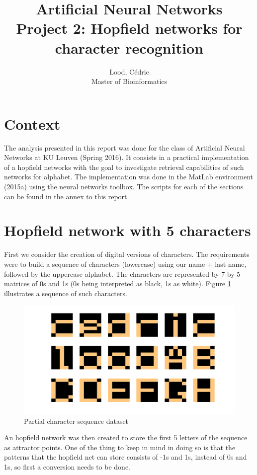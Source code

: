 \documentclass[11pt, a4paper]{article}
\title{ \huge Artificial Neural Networks \\ 
  { \large Project 2: Hopfield networks for character recognition}}
\author{
        Lood, Cédric \\
        \small Master of Bioinformatics
}
\begin{document}
\maketitle

\section{Context}
The analysis presented in this report was done for the class of
Artificial Neural Networks at KU Leuven (Spring 2016). It consists in
a practical implementation of a hopfield networks with the goal to
investigate retrieval capabilities of such networks for alphabet. The
implementation was done in the MatLab environment (2015a) using the
neural networks toolbox. The scripts for each of the sections can be
found in the annex to this report.

\section{Hopfield network with 5 characters}

First we consider the creation of digital versions of characters. The
requirements were to build a sequence of characters (lowercase) using
our name + last name, followed by the uppercase alphabet. The
characters are represented by 7-by-5 matrices of 0s and 1s (0s being
interpreted as black, 1s as white). Figure \ref{fig:hopfield_chargen}
illustrates a sequence of such characters.

\begin{figure}[H]
  \centering
  \includegraphics[scale=.30]{hopfield_chargen.png}
  \caption{Partial character sequence dataset}
  \label{fig:hopfield_chargen}
\end{figure}

An hopfield network was then created to store the first 5 letters of
the sequence as attractor points. One of the thing to keep in mind in
doing so is that the patterns that the hopfield net can store consists
of -1s and 1s, instead of 0s and 1s, so first a conversion needs to be
done. 
\end{document}
